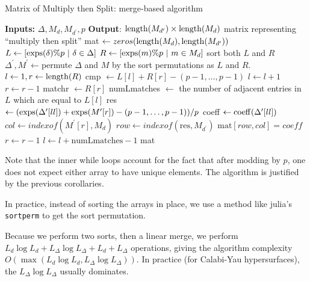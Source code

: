 \begin{algorithm}[H]
\caption{Matrix of Multiply then Split: merge-based algorithm}
\label{alg:theta:merge}
\begin{algorithmic}[1]
\State \textbf{Inputs:} \(\Delta, M_{d}, M_{d^{\prime}}, p\)
\State \textbf{Output}: $\operatorname{length}(M_{d^{\prime}}) \times \operatorname{length}(M_{d})$ 
	matrix representing ``multiply then split''
\State mat \(\gets zeros(\operatorname{length}(M_{d}), \operatorname{length}(M_{d^{\prime}}))\) 
\State $L \gets [\operatorname{exps}(\delta) \% p ~|~ \delta \in \Delta]$
\State $R \gets [\operatorname{exps}(m) \% p ~|~ m \in M_{d}]$
\State sort both  \(L\) and \(R\) 
\State \(\Delta^{\prime}, M^{\prime} \gets \)permute \(\Delta\) and \(M\) by the sort permutations as \(L\) and \(R\).
\State \(l \gets 1, r \gets \operatorname{length}(R)\)
	\State cmp \(\gets L[l] + R[r] - (p-1, \ldots, p-1)\) 
	    \State \(l \gets l + 1\) 
	    \State \(r \gets r - 1\)
        \State matchr \(\gets R[r]\) 
        \State numLmatches \(\gets\) the number of adjacent entries in \(L\) which are equal to \(L[l]\) 
                \State res \(\gets (\operatorname{exps}(\Delta^{\prime}[ll]) + \operatorname{exps}(M^{\prime}[r]) - (p-1, \ldots, p-1)) / p\) 
                \State coeff \(\gets \operatorname{coeff}(\Delta^{\prime}[ll])\)
                \State \(col \gets indexof(M^{\prime}[r],M_{d})\)
                \State \(row \gets indexof(\text{res},M_{d^{\prime}})\)
                \State \(\text{mat}[row,col] = coeff\) 
            \EndFor
            \State \(r \gets r - 1\)
        \EndWhile     
        \State \(l \gets l + \text{numLmatches} - 1\) 
    \EndIf
\EndWhile
\State \Return mat
\end{algorithmic}
\end{algorithm}

Note that the inner while loops account for the fact that
after modding by \(p\), one does not expect 
either array to have unique elements.
The algorithm is justified by the previous corollaries.

In practice, instead of sorting the arrays in place, 
we use a method like julia's \texttt{sortperm}
to get the sort permutation.

Because we perform two sorts, then a linear merge, 
we perform 
$L_{d} \log L_{d} + L_{\Delta} \log L_{\Delta} + L_{d} + L_{\Delta}$ operations, 
giving the algorithm complexity 
$O(\max(L_{d} \log L_{d}, L_{\Delta} \log L_{\Delta}))$.
In practice (for Calabi-Yau hypersurfaces), 
the $L_{\Delta} \log L_{\Delta}$ usually dominates.

